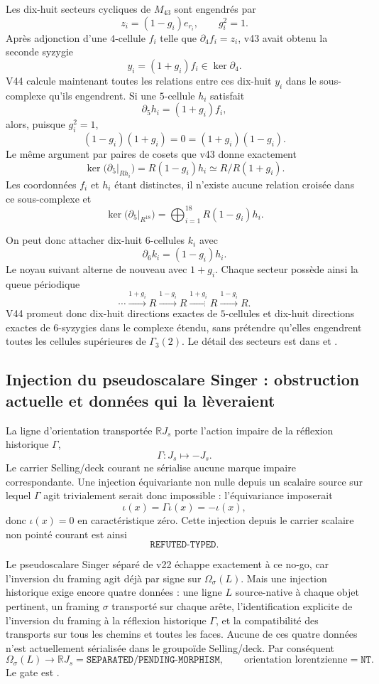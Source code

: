 \documentclass[11pt,a4paper]{article}
\newcommand{\certSeparated}{\texttt{SEPARATED}}
\newcommand{\certPending}{\texttt{PENDING-MORPHISM}}
\newcommand{\certNT}{\texttt{NT}}
\begin{document}
Les dix-huit secteurs cycliques de $M_{43}$ sont engendrés par
\[
 z_i=(1-g_i)e_{r_i},
 \qquad g_i^2=1.
\]
Après adjonction d'une $4$-cellule $f_i$ telle que $\partial_4f_i=z_i$, v43 avait obtenu la seconde syzygie
\[
 y_i=(1+g_i)f_i\in\ker\partial_4.
\]
V44 calcule maintenant toutes les relations entre ces dix-huit $y_i$ dans le sous-complexe qu'ils engendrent. Si une $5$-cellule $h_i$ satisfait
\[
 \partial_5h_i=(1+g_i)f_i,
\]
alors, puisque $g_i^2=1$,
\[
 (1-g_i)(1+g_i)=0=(1+g_i)(1-g_i).
\]
Le même argument par paires de cosets que v43 donne exactement
\[
 \ker\bigl(\partial_5|_{Rh_i}\bigr)=R(1-g_i)h_i
 \simeq R/R(1+g_i).
\]
Les coordonnées $f_i$ et $h_i$ étant distinctes, il n'existe aucune relation croisée dans ce sous-complexe et
\begin{equation}\label{eq:v44-kernel-d5}
 \boxed{
 \ker\bigl(\partial_5|_{R^{18}}\bigr)
 =\bigoplus_{i=1}^{18}R(1-g_i)h_i.}
\end{equation}

On peut donc attacher dix-huit $6$-cellules $k_i$ avec
\[
 \partial_6k_i=(1-g_i)h_i.
\]
Le noyau suivant alterne de nouveau avec $1+g_i$. Chaque secteur possède ainsi la queue périodique
\[
 \cdots\xrightarrow{1+g_i}R
 \xrightarrow{1-g_i}R
 \xrightarrow{1+g_i}R
 \xrightarrow{1-g_i}R.
\]
V44 promeut donc dix-huit directions exactes de $5$-cellules et dix-huit directions exactes de $6$-syzygies dans le complexe étendu, sans prétendre qu'elles engendrent toutes les cellules supérieures de $\Gamma_3(2)$. Le détail des secteurs est dans  et .

\subsection{Injection du pseudoscalare Singer : obstruction actuelle et données qui la lèveraient}

La ligne d'orientation transportée $\mathbb RJ_s$ porte l'action impaire de la réflexion historique $\Gamma$,
\[
 \Gamma:J_s\longmapsto-J_s.
\]
Le carrier Selling/deck courant ne sérialise aucune marque impaire correspondante. Une injection équivariante non nulle depuis un scalaire source sur lequel $\Gamma$ agit trivialement serait donc impossible : l'équivariance imposerait
\[
 \iota(x)=\Gamma\iota(x)=-\iota(x),
\]
donc $\iota(x)=0$ en caractéristique zéro. Cette injection depuis le carrier scalaire non pointé courant est ainsi
\[
 \boxed{\texttt{REFUTED-TYPED}.}
\]

Le pseudoscalare Singer séparé de v22 échappe exactement à ce no-go, car l'inversion du framing agit déjà par signe sur $\Omega_\sigma(L)$. Mais une injection historique exige encore quatre données : une ligne $L$ source-native à chaque objet pertinent, un framing $\sigma$ transporté sur chaque arête, l'identification explicite de l'inversion du framing à la réflexion historique $\Gamma$, et la compatibilité des transports sur tous les chemins et toutes les faces. Aucune de ces quatre données n'est actuellement sérialisée dans le groupoïde Selling/deck. Par conséquent
\[
 \boxed{
 \Omega_\sigma(L)\to\mathbb RJ_s
 =\certSeparated/\certPending,
 \qquad
 \text{orientation lorentzienne}=\certNT.}
\]
Le gate est .
\end{document}
